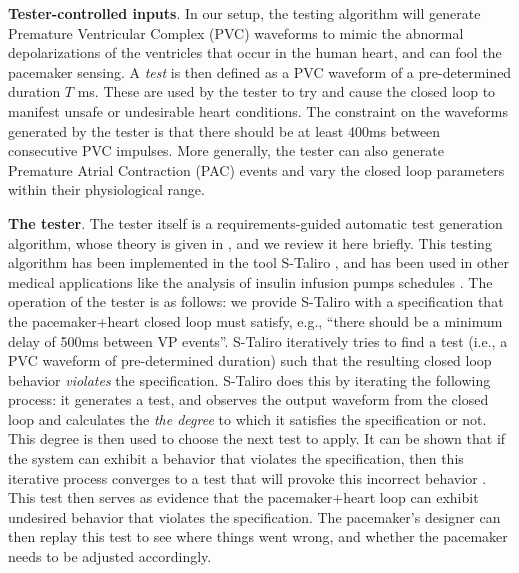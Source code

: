 \textbf{Tester-controlled inputs}.
In our setup, the testing algorithm will generate Premature Ventricular Complex (PVC) waveforms to mimic the abnormal depolarizations of the ventricles that occur in the human heart, and can fool the pacemaker sensing. 
A \emph{test} is then defined as a PVC waveform of a pre-determined duration $T$ ms.
These are used by the tester to try and cause the closed loop to manifest unsafe or undesirable heart conditions.
The constraint on the waveforms generated by the tester is that there should be at least 400ms between consecutive PVC impulses.
More generally, the tester can also generate Premature Atrial Contraction (PAC) events and vary the closed loop parameters within their physiological range.

\textbf{The tester}.
The tester itself is a requirements-guided automatic test generation algorithm, whose theory is given in \cite{AbbasFSIG13tecs}, and we review it here briefly.
This testing algorithm has been implemented in the tool S-Taliro \cite{AnnapureddyLFS11tacas}, and has been used in other medical applications like the analysis of insulin infusion pumps schedules \cite{SankaranarayananF2012cmsb}.
The operation of the tester is as follows: we provide S-Taliro with a specification that the pacemaker+heart closed loop must satisfy,
e.g., ``there should be a minimum delay of 500ms between VP events''.
S-Taliro iteratively tries to find a test (i.e., a PVC waveform of pre-determined duration) such that the resulting closed loop behavior \emph{violates} the specification.
S-Taliro does this by iterating the following process: it generates a test, and observes the output waveform from the closed loop and calculates the \emph{the degree} to which it satisfies the specification or not.
This degree is then used to choose the next test to apply. 
It can be shown that if the system can exhibit a behavior that violates the specification, then this iterative process converges to a test that will provoke this incorrect behavior \cite{AbbasF_HybridSA12}. 
This test then serves as evidence that the pacemaker+heart loop can exhibit undesired behavior that violates the specification.
The pacemaker's designer can then replay this test to see where things went wrong, and whether the pacemaker needs to be adjusted accordingly.

